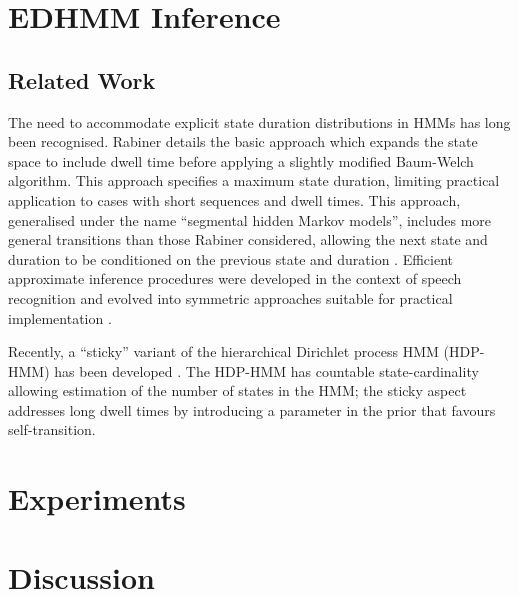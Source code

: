 \documentclass[journal]{../inc/oldtran/IEEEtran}
\begin{document}




\section{EDHMM Inference}

\label{sec:inference}




\subsection{Related Work}

The need to accommodate explicit state duration distributions in HMMs has long been recognised. Rabiner \cite{Rabiner89} details the basic approach which expands the state space to include dwell time before applying a slightly modified Baum-Welch algorithm. This approach specifies a maximum state duration, limiting practical application 
to cases with short sequences and dwell times.
This approach, generalised under the name ``segmental hidden Markov models'', includes more general transitions than those Rabiner considered, allowing the next state and duration to be conditioned on the previous state and duration \cite{Gales93}. Efficient approximate inference procedures were developed in the context of speech recognition \cite{Ostendorf96} and evolved into symmetric approaches suitable for practical implementation \cite{Yu2006}.

Recently, a ``sticky'' variant of the hierarchical Dirichlet process HMM (HDP-HMM) has been developed \cite{Fox2008}.  The HDP-HMM has countable state-cardinality \cite{Teh06} allowing estimation of the number of states in the HMM; the sticky aspect addresses long dwell times by introducing a parameter in the prior that favours self-transition. 


\section{Experiments}

\label{sec:experiments}




\section{Discussion}

\label{sec:dicussion}






\end{document}
